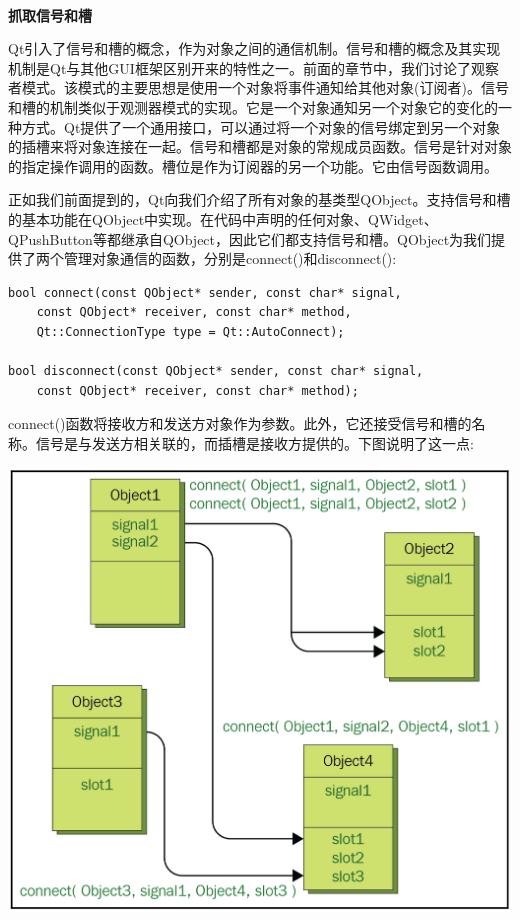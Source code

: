 \noindent\textbf{}\ \par
\textbf{抓取信号和槽} \ \par
Qt引入了信号和槽的概念，作为对象之间的通信机制。信号和槽的概念及其实现机制是Qt与其他GUI框架区别开来的特性之一。前面的章节中，我们讨论了观察者模式。该模式的主要思想是使用一个对象将事件通知给其他对象(订阅者)。信号和槽的机制类似于观测器模式的实现。它是一个对象通知另一个对象它的变化的一种方式。Qt提供了一个通用接口，可以通过将一个对象的信号绑定到另一个对象的插槽来将对象连接在一起。信号和槽都是对象的常规成员函数。信号是针对对象的指定操作调用的函数。槽位是作为订阅器的另一个功能。它由信号函数调用。 \par
正如我们前面提到的，Qt向我们介绍了所有对象的基类型QObject。支持信号和槽的基本功能在QObject中实现。在代码中声明的任何对象、QWidget、QPushButton等都继承自QObject，因此它们都支持信号和槽。QObject为我们提供了两个管理对象通信的函数，分别是connect()和disconnect(): \par

\begin{lstlisting}[caption={}]
bool connect(const QObject* sender, const char* signal,
	const QObject* receiver, const char* method,
	Qt::ConnectionType type = Qt::AutoConnect);

bool disconnect(const QObject* sender, const char* signal,
	const QObject* receiver, const char* method);
\end{lstlisting}

connect()函数将接收方和发送方对象作为参数。此外，它还接受信号和槽的名称。信号是与发送方相关联的，而插槽是接收方提供的。下图说明了这一点:  \par

\begin{center}
	\includegraphics[width=1.0\textwidth]{content/Section-2/Chapter-14/8}
\end{center}

